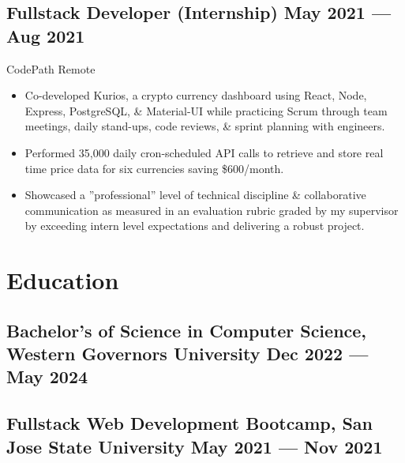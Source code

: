\documentclass[a4,10pt]{article}
\newcommand{\subtext}[1]{
#1\par\vspace{-0.2cm}}
\newenvironment{zitemize}{
\begin{itemize}\itemsep0pt \parskip0pt \parsep1pt}
{\end{itemize}\vspace{-0.5cm}}
\begin{document}

\subsection*{Fullstack Developer {\normalsize \normalfont(Internship) } \hfill  May 2021 --- Aug 2021 }
\subtext{CodePath \hfill Remote } 
    \begin{zitemize}
        \item Co-developed Kurios, a crypto currency dashboard using React, Node, Express, PostgreSQL, \& Material-UI while practicing Scrum through team meetings, daily stand-ups, code reviews, \& sprint planning with engineers.
        \item Performed 35,000 daily cron-scheduled API calls to retrieve and store real time price data for six currencies saving \$600/month.
        \item Showcased a ”professional” level of technical discipline \& collaborative communication as measured in an evaluation rubric graded by my supervisor by exceeding intern level expectations and delivering a robust project.
    \end{zitemize}








\section{Education}
\subsection*{Bachelor's of Science in Computer Science, {\normalsize \normalfont Western Governors University} \hfill Dec 2022 --- May 2024} 
\vspace{0.2cm}
\subsection*{Fullstack Web Development Bootcamp, {\normalsize \normalfont San Jose State University} \hfill May 2021 --- Nov 2021} 
\vspace{0.2cm}
\end{document}
